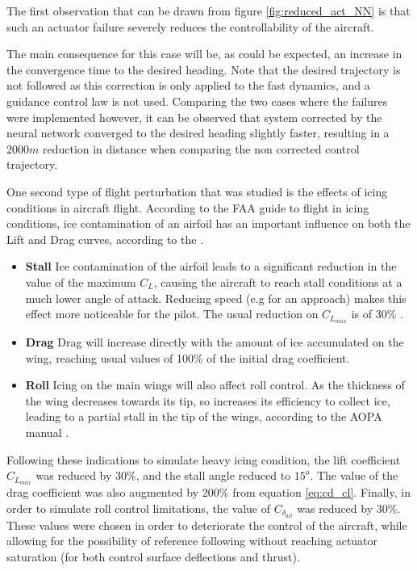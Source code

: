 The first observation that can be drawn from figure \ref{fig:reduced_act_NN} is that such an actuator failure severely reduces the controllability of the aircraft. 

The main consequence for this case will be, as could be expected, an increase in the convergence time to the desired heading. Note that the desired trajectory is not followed as this correction is only applied to the fast dynamics, and a guidance control law is not used. Comparing the two cases where the failures were implemented however, it can be observed that system corrected by the neural network converged to the desired heading slightly faster, resulting in a $2000m$ reduction in distance when comparing the non corrected control trajectory. 

One second type of flight perturbation that was studied is the effects of icing conditions in aircraft flight. According to the FAA guide to flight in icing conditions, ice contamination of an airfoil has an important influence on both the Lift and Drag curves, according to the \cite{icing_cond}.

\begin{itemize}
\item \textbf{Stall }Ice contamination of the airfoil leads to a significant reduction in the value of the maximum $C_L$, causing the aircraft to reach stall conditions at a much lower angle of attack. Reducing speed (e.g for an approach) makes this effect more noticeable for the pilot. The usual reduction on $C_{L_{max}}$ is of 30\% \cite{icing_cond}.

\item \textbf{Drag }Drag will increase directly with the amount of ice accumulated on the wing, reaching usual values of 100\% of the initial drag coefficient.

\item \textbf{Roll }Icing on the main wings will also affect roll control. As the thickness of the wing decreases towards its tip, so increases its efficiency to collect ice, leading to a partial stall in the tip of the wings, according to the AOPA manual \cite{icing_aopa}.
\end{itemize}

Following these indications to simulate heavy icing condition, the lift coefficient $C_{L_{max}}$ was reduced by 30\%, and the stall angle reduced to $15^o$. The value of the drag coefficient was also augmented by 200\% from equation \ref{eq:cd_cl}. Finally, in order to simulate roll control limitations, the value of $C_{\delta_{ail}}$ was reduced by 30\%. These values were chosen in order to deteriorate the control of the aircraft, while allowing for the possibility of reference following without reaching actuator saturation (for both control surface deflections and thrust). 

